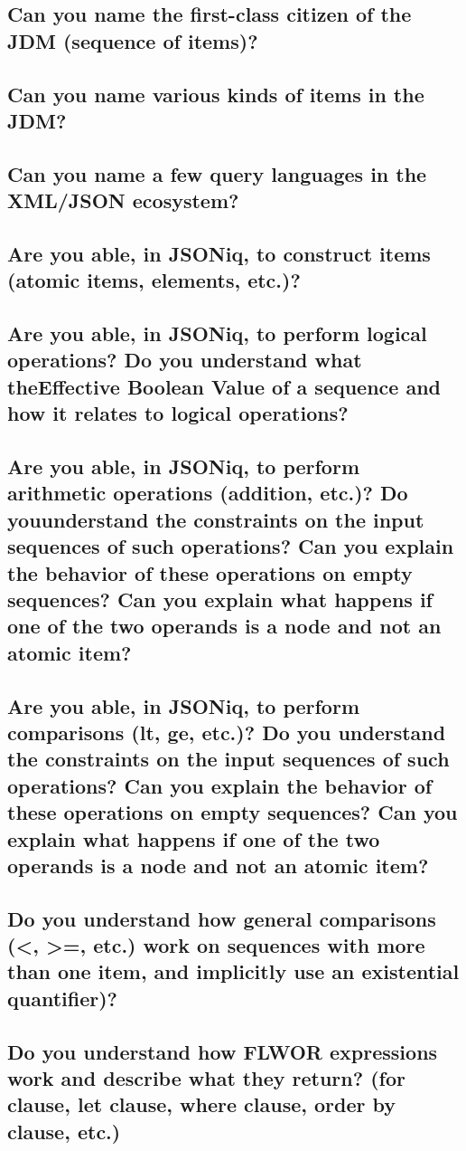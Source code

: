 \documentclass{article}
\begin{document}
\subsection{Can you name the first-class citizen of the JDM (sequence of items)?}
\subsection{Can you name various kinds of items in the JDM?}
\subsection{Can you name a few query languages in the XML/JSON ecosystem?}
\subsection{Are you able, in JSONiq, to construct items (atomic items, elements, etc.)?}
\subsection{Are you able, in JSONiq, to perform logical operations? Do you understand what theEffective Boolean Value of a sequence and how it relates to logical operations?}
\subsection{Are you able, in JSONiq, to perform arithmetic operations (addition, etc.)? Do youunderstand the constraints on the input sequences of such operations? Can you explain the behavior of these operations on empty sequences? Can you explain what happens if one of the two operands is a node and not an atomic item?}
\subsection{Are you able, in JSONiq, to perform comparisons (lt, ge, etc.)? Do you understand the constraints on the input sequences of such operations? Can you explain the behavior of these operations on empty sequences? Can you explain what happens if one of the two operands is a node and not an atomic item?}
\subsection{Do you understand how general comparisons (<, >=, etc.) work on sequences with more than one item, and implicitly use an existential quantifier)?}
\subsection{Do you understand how FLWOR expressions work and describe what they return? (for clause, let clause, where clause, order by clause, etc.)}
\end{document}
